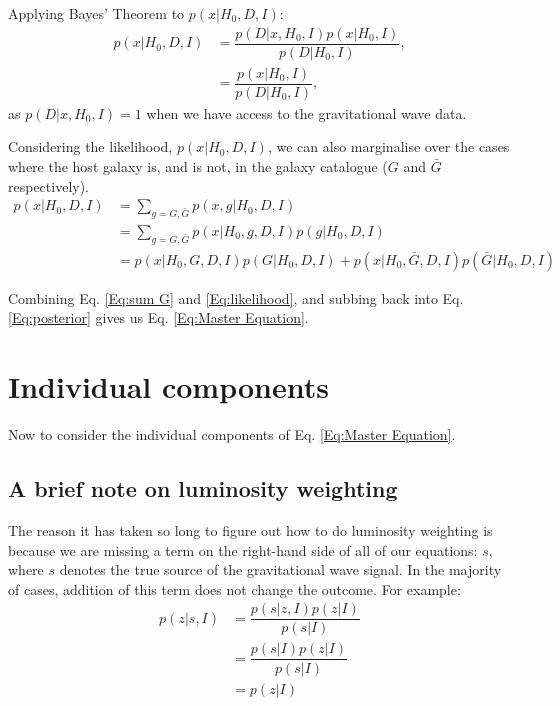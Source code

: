 \documentclass[a4paper,10pt]{article}
\begin{document}
Applying Bayes' Theorem to $p(x|H_0,D,I)$:
\begin{equation} \label{Eq:likelihood}
\begin{aligned}
p(x|H_0,D,I) &= \dfrac{p(D|x,H_0,I)p(x|H_0,I)}{p(D|H_0,I)},
\\ &= \dfrac{p(x|H_0,I)}{p(D|H_0,I)},
\end{aligned} 
\end{equation}
as $p(D|x,H_0,I)=1$ when we have access to the gravitational wave data.

Considering the likelihood, $p(x|H_0,D,I)$, we can also marginalise over the cases where the host galaxy is, and is not, in the galaxy catalogue ($G$ and $\bar{G}$ respectively).
\begin{equation} \label{Eq:sum G}
\begin{aligned}
p(x|H_0,D,I) &= \sum_{g=G,\bar{G}} p(x,g|H_0,D,I)
\\ &= \sum_{g=G,\bar{G}} p(x|H_0,g,D,I) p(g|H_0,D,I)
\\ &= p(x|H_0,G,D,I) p(G|H_0,D,I) + p(x|H_0,\bar{G},D,I) p(\bar{G}|H_0,D,I)
\end{aligned} 
\end{equation}

Combining Eq. \ref{Eq:sum G} and \ref{Eq:likelihood}, and subbing back into Eq. \ref{Eq:posterior} gives us Eq. \ref{Eq:Master Equation}.


\section{Individual components}
Now to consider the individual components of Eq. \ref{Eq:Master Equation}.


\subsection{A brief note on luminosity weighting}
The reason it has taken so long to figure out how to do luminosity weighting is because we are missing a term on the right-hand side of all of our equations: $s$, where $s$ denotes the true source of the gravitational wave signal.  In the majority of cases, addition of this term does not change the outcome.  For example:
\begin{equation}
\begin{aligned}
p(z|s,I) &= \dfrac{p(s|z,I) p(z|I)}{p(s|I)} 
\\ &= \dfrac{p(s|I) p(z|I)}{p(s|I)} 
\\ &= p(z|I)
\end{aligned}
\end{equation}
\end{document}
